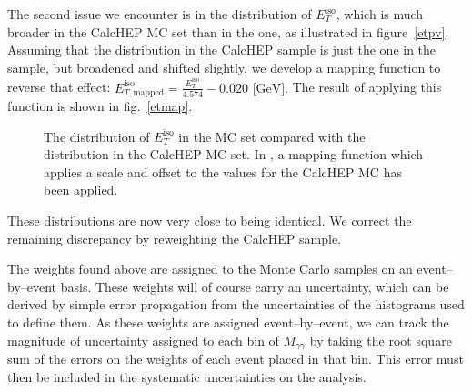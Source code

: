 The second issue we encounter is in the distribution of $E_T^\text{iso}$, which is much broader in the CalcHEP MC set than in the \atlas{} one, as illustrated in figure~\ref{etpv}. Assuming that the distribution in the CalcHEP sample is just the one in the \atlas{} sample, but broadened and shifted slightly, we develop a mapping function to reverse that effect: 
\(E_{T,\text{mapped}}^\text{iso}=\frac{E_T^\text{iso}}{4.574}-0.020\text{ [GeV].}\)
The result of applying this function is shown in fig.~\ref{etmap}.

\begin{figure}[htp]
\begin{minipage}[b]{.49\textwidth}
\begin{infilsf} \tiny 

\end{infilsf}
\end{minipage}
\hfill
\begin{minipage}[b]{.49\textwidth}
\begin{infilsf} \tiny 

\end{infilsf}
\end{minipage}
\begin{minipage}[b]{.49\textwidth}
\end{minipage}\hfill
\begin{minipage}[b]{.49\textwidth}
\end{minipage}
\caption{The distribution of $E_T^\text{iso}$ in the \atlas{} MC set compared with the distribution in the CalcHEP MC set. In , a mapping function which applies a scale and offset to the values for the CalcHEP MC has been applied.}
\end{figure}

These distributions are now very close to being identical. We correct the remaining discrepancy by reweighting the CalcHEP sample.

The weights found above are assigned to the Monte Carlo samples on an event--by--event basis. These weights will of course carry an uncertainty, which can be derived by simple error propagation from the uncertainties of the histograms used to define them. As these weights are assigned event--by--event, we can track the magnitude of uncertainty assigned to each bin of $M_{\gamma\gamma}$ by taking the root square sum of the errors on the weights of each event placed in that bin. This error must then be included in the systematic uncertainties on the analysis.

